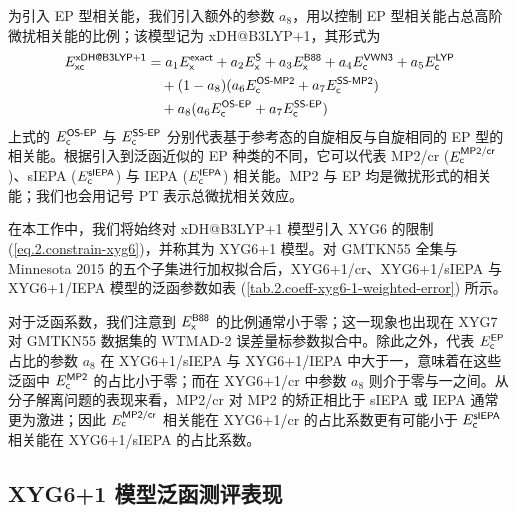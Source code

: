为引入 EP 型相关能，我们引入额外的参数 $a_8$，用以控制 EP 型相关能占总高阶微扰相关能的比例；该模型记为 xDH@B3LYP+1，其形式为
\begin{align}
  E_{\textsf{xc}}^{\textsf{xDH@B3LYP+1}} &= a_1 E_{\textsf{x}}^{\textsf{exact}} + a_2 E_{\textsf{x}}^{\textsf{S}} + a_3 E_{\textsf{x}}^{\textsf{B88}} + a_4 E_{\textsf{c}}^{\textsf{VWN3}} + a_5 E_{\textsf{c}}^{\textsf{LYP}} \notag \\
  &\quad + (1 - a_8) (a_6 E_{\textsf{c}}^{\textsf{OS-MP2}} + a_7 E_{\textsf{c}}^{\textsf{SS-MP2}}) \notag\\
  &\quad + a_8 (a_6 E_{\textsf{c}}^{\textsf{OS-EP}} + a_7 E_{\textsf{c}}^{\textsf{SS-EP}})
\end{align}
上式的 $E_{\textsf{c}}^{\textsf{OS-EP}}$ 与 $E_{\textsf{c}}^{\textsf{SS-EP}}$ 分别代表基于参考态的自旋相反与自旋相同的 EP 型的相关能。根据引入到泛函近似的 EP 种类的不同，它可以代表 MP2/cr ($E_{\textsf{c}}^{\textsf{MP2/cr}}$)、sIEPA ($E_{\textsf{c}}^{\textsf{sIEPA}}$) 与 IEPA ($E_{\textsf{c}}^{\textsf{IEPA}}$) 相关能。MP2 与 EP 均是微扰形式的相关能；我们也会用记号 PT 表示总微扰相关效应。

在本工作中，我们将始终对 xDH@B3LYP+1 模型引入 XYG6 的限制 (\ref{eq.2.constrain-xyg6})，并称其为 XYG6+1 模型。对 GMTKN55 全集与 Minnesota 2015 的五个子集进行加权拟合后，XYG6+1/cr、XYG6+1/sIEPA 与 XYG6+1/IEPA 模型的泛函参数如表 (\ref{tab.2.coeff-xyg6-1-weighted-error}) 所示。

对于泛函系数，我们注意到 $E_{\textsf{x}}^{\textsf{B88}}$ 的比例通常小于零；这一现象也出现在 XYG7 对 GMTKN55 数据集的 WTMAD-2 误差量标参数拟合中。除此之外，代表 $E_{\textsf{c}}^{\textsf{EP}}$ 占比的参数 $a_8$ 在 XYG6+1/sIEPA 与 XYG6+1/IEPA 中大于一，意味着在这些泛函中 $E_{\textsf{c}}^{\textsf{MP2}}$ 的占比小于零；而在 XYG6+1/cr 中参数 $a_8$ 则介于零与一之间。从分子解离问题的表现来看，MP2/cr 对 MP2 的矫正相比于 sIEPA 或 IEPA 通常更为激进；因此 $E_{\textsf{c}}^{\textsf{MP2/cr}}$ 相关能在 XYG6+1/cr 的占比系数更有可能小于 $E_{\textsf{c}}^{\textsf{sIEPA}}$ 相关能在 XYG6+1/sIEPA 的占比系数。

\subsection{XYG6+1 模型泛函测评表现}
\label{sec.2.xyg6-1-model-benchmark}

